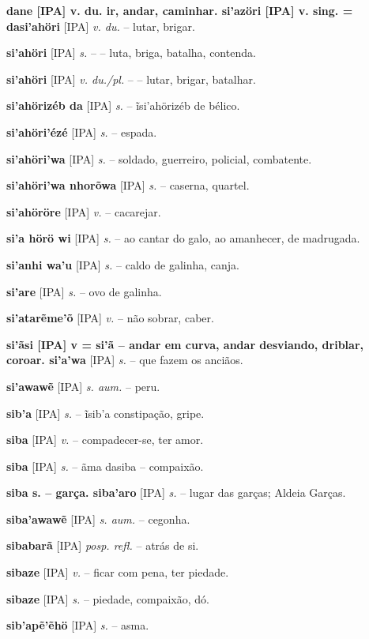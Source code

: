 {\textbf{dane [IPA] v. du. ir, andar, caminhar. si'azöri [IPA] v. sing. = dasi'ahöri} [IPA] \textit{v. du.} -- lutar, brigar.

\textbf{si'ahöri} [IPA] \textit{s.} -- -- luta, briga, batalha, contenda.

\textbf{si'ahöri} [IPA] \textit{v. du./pl.} -- -- lutar, brigar, batalhar.

\textbf{si'ahörizéb da} [IPA] \textit{s.} -- ĩsi'ahörizéb de bélico.

\textbf{si'ahöri'ézé} [IPA] \textit{s.} -- espada.

\textbf{si'ahöri'wa} [IPA] \textit{s.} -- soldado, guerreiro, policial, combatente.

\textbf{si'ahöri'wa nhorõwa} [IPA] \textit{s.} -- caserna, quartel.

\textbf{si'ahöröre} [IPA] \textit{v.} -- cacarejar.

\textbf{si'a hörö wi} [IPA] \textit{s.} -- ao cantar do galo, ao amanhecer, de madrugada.

\textbf{si'anhi wa'u} [IPA] \textit{s.} -- caldo de galinha, canja.

\textbf{si'are} [IPA] \textit{s.} -- ovo de galinha. \href{https://xavante.pythonanywhere.com/static/dicionario/play.html?file=egg.wav}{\faHeadphones}

\textbf{si'atarẽme'õ} [IPA] \textit{v.} -- não sobrar, caber.

\textbf{si'ãsi [IPA] v = si'ã -- andar em curva, andar desviando, driblar, coroar. si'a'wa} [IPA] \textit{s.} -- que fazem os anciãos.

\textbf{si'awawẽ} [IPA] \textit{s. aum.} -- peru.

\textbf{sib'a} [IPA] \textit{s.} -- ĩsib'a constipação, gripe.

\textbf{siba} [IPA] \textit{v.} -- compadecer-se, ter amor.

\textbf{siba} [IPA] \textit{s.} -- ãma dasiba -- compaixão.

\textbf{siba s. -- garça. siba'aro} [IPA] \textit{s.} -- lugar das garças; Aldeia Garças.

\textbf{siba'awawẽ} [IPA] \textit{s. aum.} -- cegonha.

\textbf{sibabarã} [IPA] \textit{posp. refl.} -- atrás de si.

\textbf{sibaze} [IPA] \textit{v.} -- ficar com pena, ter piedade.

\textbf{sibaze} [IPA] \textit{s.} -- piedade, compaixão, dó.

\textbf{sib'apẽ'ẽhö} [IPA] \textit{s.} -- asma.

}
